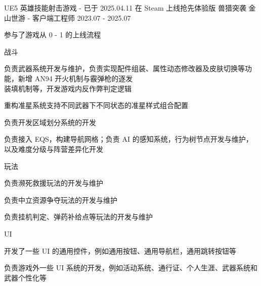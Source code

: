 

\begin{cventries}

\cventry
    {UE5 英雄技能射击游戏 - 已于 2025.04.11 在 Steam 上线抢先体验版} %
    {兽猎突袭} %
    {金山世游 - 客户端工程师} %
    {2023.07 - 2025.07} %
    {
        \begin{cvitems}
            \item {参与了游戏从 0 - 1 的上线流程}
            \item {战斗
                \begin{cvsubitems}
                    \item {负责武器系统开发与维护​​，负责实现配件组装、属性动态修改器及皮肤切换等功能，新增 AN94 开火机制与霰弹枪的逐发\\装填机制等，开发游戏内反作弊判定逻辑}
                    \item {重构准星系统支持不同武器下不同状态的准星样式组合配置}
                    \item {负责开发区域划分系统的开发}
                    \item {负责接入 EQS，构建导航网格；负责 AI 的感知系统，行为树节点开发与维护，以及难度分级与阵营差异化开发}
                \end{cvsubitems}
            }
            \item {玩法
                \begin{cvsubitems}
                    \item {负责濒死救援玩法的开发与维护}
                    \item {负责中立资源争夺玩法的开发与维护}
                    \item {负责挂机判定、弹药补给点等玩法的开发与维护}
                \end{cvsubitems}
            }
            \item {UI
                \begin{cvsubitems}
                    \item {开发了一些 UI 的通用控件，例如通用按钮、通用导航栏，通用跳转按钮等}
                    \item {负责游戏外一些 UI 系统的开发，例如活动系统、通行证、个人生涯、武器系统和武器个性化等}

\end{cvsubitems}}
\end{cvitems}}
\end{cventries}
